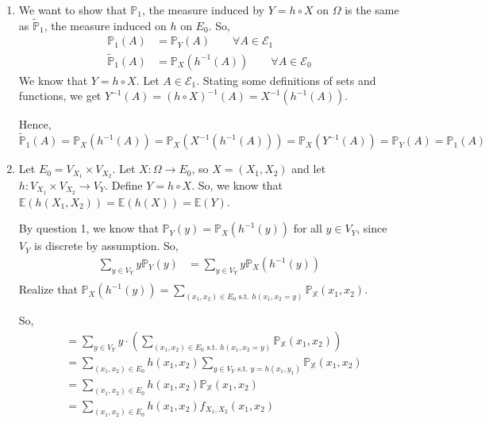 \documentclass[12pt]{article}
\begin{document}

\begin{enumerate}[start=1,label={\bfseries Problem \arabic*:},leftmargin=1in] %
    \item We want to show that $\mathbb{P}_1$, the measure induced by $Y = h \circ X$ on $\Omega$ is the same as $\tilde{\mathbb{P}}_{1}$, the measure induced on $h$ on $E_{0}$.
    So, 
    \begin{align*}
        \mathbb{P}_1(A) &= \mathbb{P}_Y(A) \qquad \forall A \in \mathcal{E}_{1} \\ 
        \tilde{\mathbb{P}}_1(A) &= \mathbb{P}_X(h^{-1}(A)) \qquad \forall A \in \mathcal{E}_{0}
    \end{align*}
    We know that $Y = h \circ X$. Let $A \in \mathcal{E}_{1}$.
    Stating some definitions of sets and functions, we get $Y^{-1}(A) = (h \circ X)^{-1}(A) = X^{-1}(h^{-1}(A))$.

    Hence, 
    \[
        \tilde{\mathbb{P}}_1(A) = \mathbb{P}_X(h^{-1}(A)) = \mathbb{P}_X(X^{-1}(h^{-1}(A))) = \mathbb{P}_X(Y^{-1}(A)) = \mathbb{P}_Y(A) = \mathbb{P}_1(A)
    \]  
    \item Let $E_{0} = V_{X_{1}} \times V_{X_{2}}$. Let $X: \Omega \to E_{0}$, so $X = (X_{1}, X_{2})$ and let $h: V_{X_{1}} \times V_{X_{2}} \rightarrow V_{Y}$. 
    Define $Y = h \circ X$. So, we know that $\mathbb{E}(h(X_{1}, X_{2})) = \mathbb{E}(h(X)) = \mathbb{E}(Y)$. 

    By question 1, we know that $\mathbb{P}_{Y}(y) = \mathbb{P}_{X}(h^{-1}(y))$ for all $y \in V_{Y}$, since $V_{Y}$ is discrete by assumption. 
    So, 
    \begin{align*}
        \sum_{y \in V_{Y}} y\mathbb{P}_{Y}(y) &= \sum_{y \in V_{Y}} y\mathbb{P}_{X}(h^{-1}(y)) \\
    \end{align*}
    Realize that $\mathbb{P}_{X}(h^{-1}(y)) = \sum_{(x_{1}, x_{2}) \in E_{0} \text{ s.t. }h(x_{1}, x_{2} = y)} \mathbb{P_{X}}(x_{1},x_{2})$. 
    
    So, 
    \begin{align*}
        &= \sum_{y \in V_{Y}} y \cdot (\sum_{(x_{1}, x_{2}) \in E_{0} \text{ s.t. }h(x_{1}, x_{2} = y)} \mathbb{P_{X}}(x_{1},x_{2}))\\
        &= \sum_{(x_{1}, x_{2}) \in E_{0}} h(x_{1}, x_{2}) \sum_{y \in V_{Y} \text{ s.t. } y = h(x_{1}, y_{1})}\mathbb{P_{X}}(x_{1},x_{2})\\ 
        &= \sum_{(x_{1}, x_{2}) \in E_{0}} h(x_{1}, x_{2}) \mathbb{P_{X}}(x_{1},x_{2})\\
        &=\sum_{(x_{1}, x_{2}) \in E_{0}} h(x_{1}, x_{2}) f_{X_{1}, X_{2}}(x_{1},x_{2})
    \end{align*}


\end{enumerate}
\end{document}
